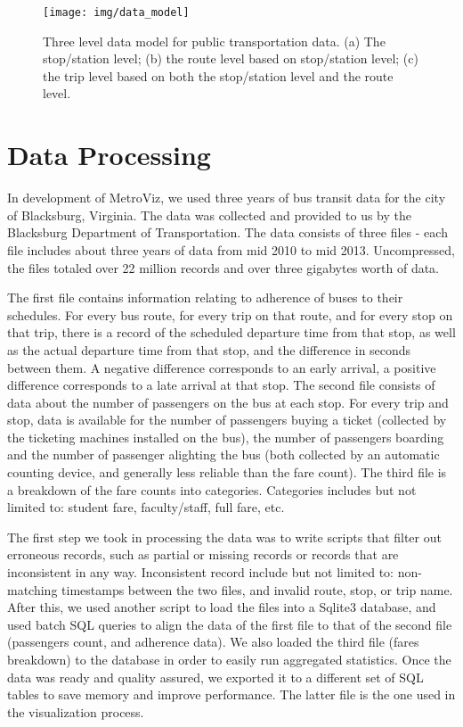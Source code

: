 \documentclass[journal]{vgtc}
\begin{document}
\begin{figure}[htb]
 \centering
 \texttt{[image: img/data\_model]}
 \caption{Three level data model for public transportation data. (a) The stop/station level; (b) the route level based on stop/station level; (c) the trip level based on both the stop/station level and the route level.}
 \label{data_model}
\end{figure}

\section{Data Processing}

In development of MetroViz, we used three years of bus transit data for the city of Blacksburg, Virginia. The data was collected and provided to us by the Blacksburg Department of Transportation. The data consists of three files - each file includes about three years of data from mid 2010 to mid 2013. Uncompressed, the files totaled over 22 million records and over three gigabytes worth of data.

The first file contains information relating to adherence of buses to their schedules. For every bus route, for every trip on that route, and for every stop on that trip, there is a record of the scheduled departure time from that stop, as well as the actual departure time from that stop, and the difference in seconds between them. A negative difference corresponds to an early arrival, a positive difference corresponds to a late arrival at that stop. The second file consists of data about the number of passengers on the bus at each stop. For every trip and stop, data is available for the number of passengers buying a ticket (collected by the ticketing machines installed on the bus), the number of passengers boarding and the number of passenger alighting the bus (both collected by an automatic counting device, and generally less reliable than the fare count). The third file is a breakdown of the fare counts into categories. Categories includes but not limited to: student fare, faculty/staff, full fare, etc.

The first step we took in processing the data was to write scripts that filter out erroneous records, such as partial or missing records or records that are inconsistent in any way. Inconsistent record include but not limited to: non-matching timestamps between the two files, and invalid route, stop, or trip name. After this, we used another script to load the files into a Sqlite3 database, and used batch SQL queries to align the data of the first file to that of the second file (passengers count, and adherence data). We also loaded the third file (fares breakdown) to the database in order to easily run aggregated statistics. Once the data was ready and quality assured, we exported it to a different set of SQL tables to save memory and improve performance. The latter file is the one used in the visualization process.
\end{document}

